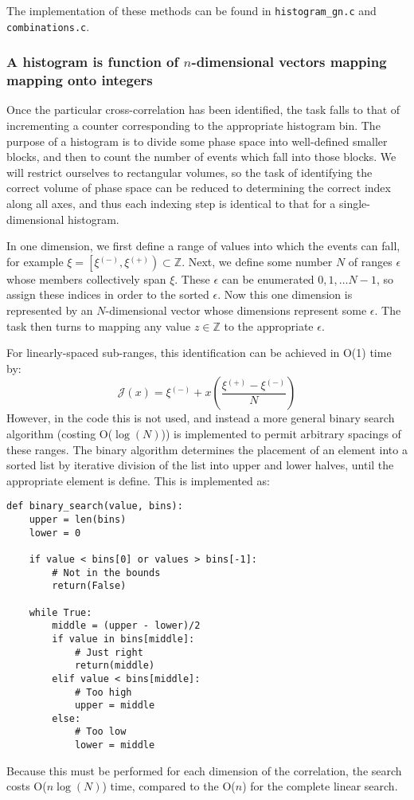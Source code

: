 \documentclass{article}
\newcommand{\parens}[1]{\ensuremath{\left( #1 \right)}}
\newcommand{\integers}{\ensuremath{\mathbb{Z}}}
\newcommand{\timewindow}{\ensuremath{\xi}}
\newcommand{\resolution}{\ensuremath{\epsilon}}
\newcommand{\Index}{\ensuremath{\mathcal{J}}}
\newcommand{\upplus}{\ensuremath{^{(+)}}}
\newcommand{\upminus}{\ensuremath{^{(-)}}}
\begin{document}
The implementation of these methods can be found in \texttt{histogram\_gn.c} and \texttt{combinations.c}.

\subsubsection{A histogram is function of $n$-dimensional vectors mapping mapping onto integers}
Once the particular cross-correlation has been identified, the task falls to that of incrementing a counter corresponding to the appropriate histogram bin. The purpose of a histogram is to divide some phase space into well-defined smaller blocks, and then to count the number of events which fall into those blocks. We will restrict ourselves to rectangular volumes, so the task of identifying the correct volume of phase space can be reduced to determining the correct index along all axes, and thus each indexing step is identical to that for a single-dimensional histogram. 

In one dimension, we first define a range of values into which the events can fall, for example $\timewindow=\left[\timewindow\upminus,\timewindow\upplus\right)\subset\integers$. Next, we define some number $N$ of ranges $\resolution$ whose members collectively span $\timewindow$. These $\resolution$ can be enumerated $0,1,\ldots N-1$, so assign these indices in order to the sorted $\resolution$. Now this one dimension is represented by an $N$-dimensional vector whose dimensions represent some $\resolution$. The task then turns to mapping any value $z\in\integers$ to the appropriate $\resolution$.

For linearly-spaced sub-ranges, this identification can be achieved in O(1) time by:
\begin{equation}
\Index(x) = \timewindow\upminus + x\parens{\frac{\timewindow\upplus-\timewindow\upminus}{N}}
\end{equation}
However, in the code this is not used, and instead a more general binary search algorithm (costing O($\log(N)$)) is implemented to permit arbitrary spacings of these ranges. The binary algorithm determines the placement of an element into a sorted list by iterative division of the list into upper and lower halves, until the appropriate element is define. This is implemented as:
\begin{lstlisting}
def binary_search(value, bins):
    upper = len(bins)
    lower = 0
    
    if value < bins[0] or values > bins[-1]:
        # Not in the bounds
        return(False)
     
    while True:
        middle = (upper - lower)/2
        if value in bins[middle]:
            # Just right
            return(middle)
        elif value < bins[middle]:
            # Too high
            upper = middle
        else:
            # Too low
            lower = middle
\end{lstlisting}
Because this must be performed for each dimension of the correlation, the search costs O($n\log{(N)}$) time, compared to the O($n$) for the complete linear search. 
\end{document}

